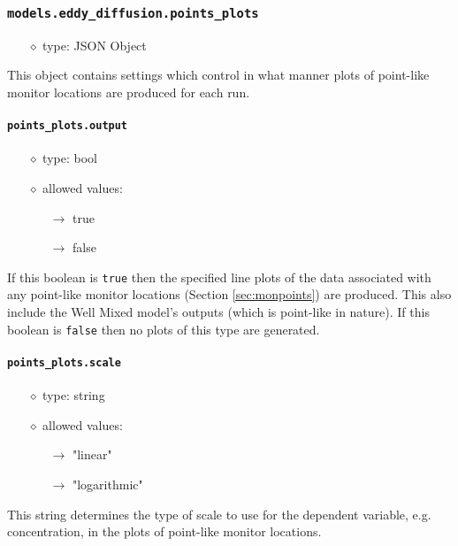 \documentclass[]{article}
\def\code#1{\texttt{#1}}
\begin{document}
\subsubsection{\code{models.eddy\_diffusion.points\_plots}}
\begin{itemize}
    \item[$\diamond$] type: JSON Object 
\end{itemize}
This object contains settings which control in what manner plots of point-like
monitor locations are produced for each run. 

\paragraph{\code{points\_plots.output}}
\begin{itemize}
    \item[$\diamond$] type: bool 
    \item[$\diamond$] allowed values:
    \begin{itemize}
        \item[$\rightarrow$] true
        \item[$\rightarrow$] false
    \end{itemize}
\end{itemize}
If this boolean is \code{true} then the specified line plots of the data
associated with any point-like monitor locations (Section \ref{sec:monpoints})
are produced. This also include the Well Mixed model's outputs (which is
point-like in nature). If this boolean is \code{false} then no plots of this
type are generated.

\paragraph{\code{points\_plots.scale}}
\begin{itemize}
    \item[$\diamond$] type: string 
    \item[$\diamond$] allowed values:
    \begin{itemize}
        \item[$\rightarrow$] "linear"
        \item[$\rightarrow$] "logarithmic"
    \end{itemize}
\end{itemize}
This string determines the type of scale to use for the dependent variable, e.g.
concentration, in the plots of point-like monitor locations.
\end{document}
